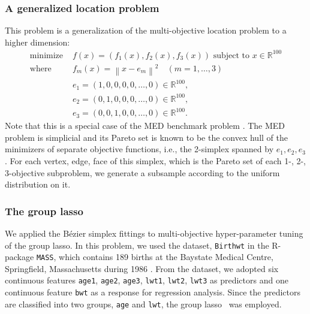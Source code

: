 \documentclass[letterpaper]{article} %
\theoremstyle{plain}
\newcommand{\norm}[1]{\left\| #1 \right\|}
\newcommand{\R}{\mathbb{R}}
\begin{document}
\subsubsection{A generalized location problem}\label{sec:location-problem}
This problem is a generalization of the multi-objective location problem \cite{Kuhn1967} to a higher dimension:
\begin{equation}
    \begin{split}
    \text{minimize } & f(x) = (f_1(x), f_2(x), f_3(x)) \text{ subject to } x \in \R^{100}\\
    \text{where }    & f_m(x) = \norm{x - e_m}^2 \quad (m = 1, \dots, 3)\\
                     & e_1 = (1, 0, 0, 0, 0, \dots, 0) \in \R^{100},\\
                     & e_2 = (0, 1, 0, 0, 0, \dots, 0) \in \R^{100},\\
                     & e_3 = (0, 0, 1, 0, 0, \dots, 0) \in \R^{100}.
    \end{split}
\end{equation}
Note that this is a special case of the MED benchmark problem \cite{Hamada2010}.
The MED problem is simplicial \cite{Hamada2017} and its Pareto set is known to be the convex hull of the minimizers of separate objective functions, i.e., the 2-simplex spanned by $e_1, e_2, e_3$.
For each vertex, edge, face of this simplex, which is the Pareto set of each 1-, 2-, 3-objective subproblem, we generate a subsample according to the uniform distribution on it.


\subsubsection{The group lasso}\label{sec:group-lasso}
We applied the B\'ezier simplex fittings to multi-objective hyper-parameter tuning of the group lasso.
In this problem, we used the dataset, \texttt{Birthwt} in the R-package \texttt{MASS}, which contains 189 births at the Baystate Medical Centre, Springfield, Massachusetts during 1986 \cite{Hosmer1989,Venables2002}.
From the dataset, we adopted six continuous features \texttt{age1}, \texttt{age2}, \texttt{age3}, \texttt{lwt1}, \texttt{lwt2}, \texttt{lwt3} as predictors and one continuous feature \texttt{bwt} as a response for regression analysis.
Since the predictors are classified into two groups, \texttt{age} and \texttt{lwt}, the group lasso~\cite{Yuan2006} was employed.
\end{document}
